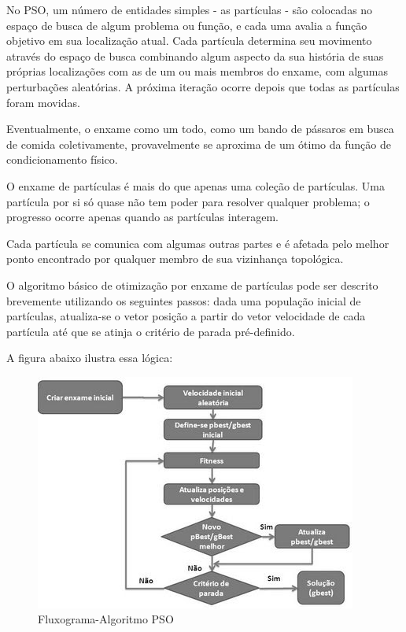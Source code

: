 \documentclass[conference]{IEEEtran}
\begin{document}
	No PSO, um número de entidades simples - as partículas - são colocadas no espaço de busca de algum problema ou função, e cada uma avalia a função objetivo em sua localização atual. Cada partícula determina seu movimento através do espaço de busca combinando algum aspecto da sua história de suas próprias localizações com as de um ou mais membros do enxame, com algumas perturbações aleatórias. A próxima iteração ocorre depois que todas as partículas foram movidas. 
	
	Eventualmente, o enxame como um todo, como um bando de pássaros em busca de comida coletivamente, provavelmente se aproxima de um ótimo da função de condicionamento físico.
	
	O enxame de partículas é mais do que apenas uma coleção de partículas. Uma partícula por si só quase não tem poder para resolver qualquer problema; o progresso ocorre apenas quando as partículas interagem.

	Cada partícula se comunica com algumas outras partes e é afetada pelo melhor ponto encontrado por qualquer membro de sua vizinhança topológica. 

	O algoritmo básico de otimização por enxame de partículas pode ser descrito brevemente utilizando os seguintes passos: dada uma população inicial de partículas, atualiza-se o vetor posição a partir do vetor velocidade de cada partícula até que se atinja o critério de parada pré-definido. 
	
	A figura abaixo ilustra essa lógica:
	
	\begin{figure}[htbp]
	\centerline{\includegraphics[scale=0.4]{pso_algoritmo.JPG}}
	\caption{Fluxograma-Algoritmo PSO}
	\label{fig}
	\end{figure}
	
\end{document}
